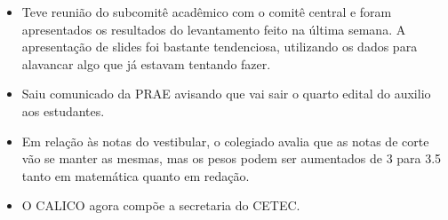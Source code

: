 \documentclass{ata-calico}
\begin{document}
\maketitle

\begin{itemize}
\item Teve reunião do subcomitê acadêmico com o comitê central e foram apresentados os resultados do levantamento feito na última semana. A apresentação de slides foi bastante tendenciosa, utilizando os dados para alavancar algo que já estavam tentando fazer.
\item Saiu comunicado da PRAE avisando que vai sair o quarto edital do auxilio aos estudantes.
\item Em relação às notas do vestibular, o colegiado avalia que as notas de corte vão se manter as mesmas, mas os pesos podem ser aumentados de 3 para 3.5 tanto em matemática quanto em redação.
\item O CALICO agora compõe a secretaria do CETEC.
\end{itemize}
\end{document}
